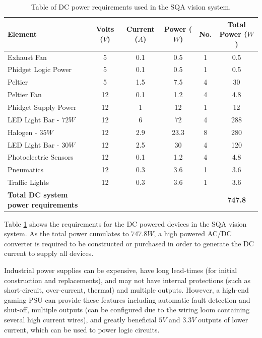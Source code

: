 \documentclass[fleqn,twoside]{article}
\begin{document}
\renewcommand{\arraystretch}{0.8}%
\begin{table}[h]
	\caption{Table of DC power requirements used in the SQA vision system.}
	\label{tab:DC_power_table}
	\begin{tabularx}{\linewidth}{p{6cm}ccccc}
		
		\toprule
		\textbf{Element} & \textbf{Volts ($V$)} & \textbf{Current ($A$)} & \textbf{Power ($W$)} & \textbf{No.} & \textbf{Total Power ($W$)}\\[8pt]
		\midrule
		
		Exhaust Fan & 5 & 0.1 & 0.5 & 1 & 0.5 \\[4pt]
		\midrule
		Phidget Logic Power  & 5 & 0.1 & 0.5 & 1 & 0.5 \\[4pt]
		\midrule
		Peltier & 5 & 1.5 & 7.5 & 4 & 30 \\[4pt]
		\midrule
		Peltier Fan & 12 & 0.1 & 1.2 & 4 & 4.8 \\[4pt]
		\midrule
		Phidget Supply Power & 12 & 1 & 12 & 1 & 12 \\[4pt]
		\midrule
		LED Light Bar - $72W$ & 12 & 6 & 72 & 4 & 288 \\[4pt]
		\midrule
		Halogen - $35W$ & 12 & 2.9 & 23.3 & 8 & 280 \\[4pt]
		\midrule
		LED Light Bar - $30W$ & 12 & 2.5 & 30 & 4 & 120 \\[4pt]
		\midrule
		Photoelectric Sensors & 12 & 0.1 & 1.2 & 4 & 4.8 \\[4pt]
		\midrule
		Pneumatics & 12 & 0.3 & 3.6 & 1 & 3.6 \\[4pt]
		\midrule
		Traffic Lights & 12 & 0.3 & 3.6 & 1 & 3.6 \\[4pt]
		
		\midrule\midrule
		\textbf{Total DC system power requirements} &  &  &  &  & \textbf{747.8}\\[8pt]
		\bottomrule
		
	\end{tabularx}
\end{table}
 

Table \ref{tab:DC_power_table} shows the requirements for the DC powered devices in the SQA vision system. As the total power cumulates to $747.8W$, a high powered AC/DC converter is required to be constructed or purchased in order to generate the DC current to supply all devices.

Industrial power supplies can be expensive, have long lead-times (for initial construction and replacements), and may not have internal protections (such as short-circuit, over-current, thermal) and multiple outputs. However, a high-end gaming PSU can provide these features including automatic fault detection and shut-off, multiple outputs (can be configured due to the wiring loom containing several high current wires), and greatly beneficial $5V$ and $3.3V$ outputs of lower current, which can be used to power logic circuits. 
\end{document}
